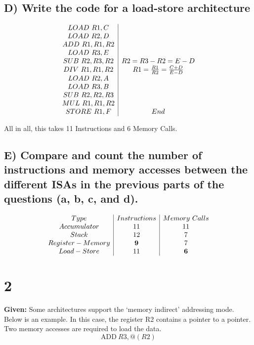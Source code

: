 \documentclass{article}
\begin{document}
\subsection{D) Write the code for a load-store architecture}
\begin{centering}
  \begin{displaymath}
  \begin{array}{c | c}
		LOAD\ R1,C \\
		LOAD\ R2,D \\
		ADD\ R1,R1,R2 \\
		LOAD\ R3,E \\
		SUB\ R2,R3,R2 & R2=R3-R2=E-D \\
		DIV\ R1,R1,R2 & R1=\frac{R1}{R2}=\frac{C+D}{E-D} \\
		LOAD\ R2,A \\
		LOAD\ R3,B \\
		SUB\ R2,R2,R3 \\
		MUL\ R1,R1,R2 \\
		STORE\ R1,F & End \\
  \end{array}
  \end{displaymath}
\end{centering}
All in all, this takes 11 Instructions and 6 Memory Calls.


\subsection{E) Compare and count the number of instructions and memory accesses between the different ISAs in the previous parts of the questions (a, b, c, and d).}
\begin{centering}
  \begin{displaymath}
  \begin{array}{c | c | c}
		Type & Instructions & Memory\ Calls \\
		Accumulator & 11 & 11 \\
		Stack & 12 & 7 \\
		Register-Memory & \textbf{9} & 7 \\
		Load-Store & 11 & \textbf{6} \\
  \end{array}
  \end{displaymath}
\end{centering}

\newpage

\section{2}
\textbf{Given: } Some architectures support the ‘memory indirect’ addressing mode. Below is an example. In this case, the register R2 contains a pointer to a pointer. Two memory accesses are required to load the data.
$$ \text{ADD}\ R3,@(R2) $$
\end{document}
